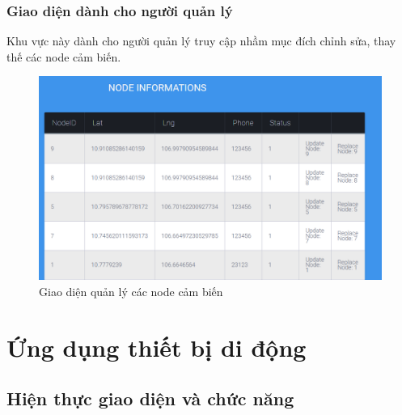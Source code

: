\subsubsection*{Giao diện dành cho người quản lý}
Khu vực này dành cho người quản lý truy cập nhầm mục đích chỉnh sửa, thay thế các node cảm biến.
\begin{center}
\begin{figure}[H]
\centering    
\includegraphics[width=1\textwidth]{web_nodeinfo}
\caption[Giao diện quản lý các node cảm biến]{Giao diện quản lý các node cảm biến}
\label{fig:web_nodeinfo}
\end{figure}
\end{center}
\section{Ứng dụng thiết bị di động}
\subsection{Hiện thực giao diện và chức năng}

